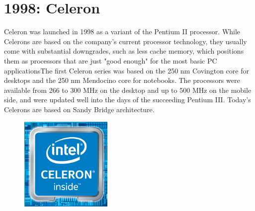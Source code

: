 \hypertarget{celeron}{%
\section{1998: Celeron}\label{celeron}}

Celeron was launched in 1998 as a variant of the Pentium II processor.
While Celerons are based on the company's current processor technology,
they usually come with substantial downgrades, such as less cache
memory, which positions them as processors that are just "good enough"
for the most basic PC applicationsThe first Celeron series was based on
the 250 nm Covington core for desktops and the 250 nm Mendocino core for
notebooks. The processors were available from 266 to 300 MHz on the
desktop and up to 500 MHz on the mobile side, and were updated well into
the days of the succeeding Pentium III. Today's Celerons are based on
Sandy Bridge architecture.

\begin{figure}[ht!]
	\centering
\includegraphics[width=1.75939in,height=1.80104in]{media/image18.png}
\end{figure}




